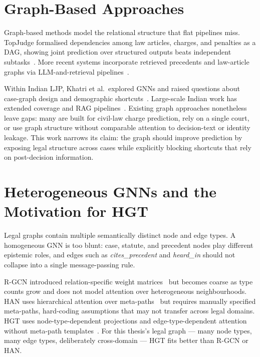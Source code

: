\section{Graph-Based Approaches}

Graph-based methods model the relational structure that flat pipelines miss. TopJudge formalised dependencies among law articles, charges, and penalties as a DAG, showing joint prediction over structured outputs beats independent subtasks~\cite{zhong2018topjudge}. More recent systems incorporate retrieved precedents and law-article graphs via LLM-and-retrieval pipelines~\cite{wu2023pljp, santosh2024precedents}.

Within Indian LJP, Khatri et al.\ explored GNNs and raised questions about case-graph design and demographic shortcuts~\cite{khatri2023indianGNN}. Large-scale Indian work has extended coverage and RAG pipelines~\cite{nigam2025nyayaanumana}. Existing graph approaches nonetheless leave gaps: many are built for civil-law charge prediction, rely on a single court, or use graph structure without comparable attention to decision-text or identity leakage. This work narrows its claim: the graph should improve prediction by exposing legal structure across cases while explicitly blocking shortcuts that rely on post-decision information.

\section{Heterogeneous GNNs and the Motivation for HGT}

Legal graphs contain multiple semantically distinct node and edge types. A homogeneous GNN is too blunt: case, statute, and precedent nodes play different epistemic roles, and edges such as \emph{cites\_precedent} and \emph{heard\_in} should not collapse into a single message-passing rule.

R-GCN introduced relation-specific weight matrices~\cite{schlichtkrull2018rgcn} but becomes coarse as type counts grow and does not model attention over heterogeneous neighbourhoods. HAN uses hierarchical attention over meta-paths~\cite{wang2019han} but requires manually specified meta-paths, hard-coding assumptions that may not transfer across legal domains. HGT uses node-type-dependent projections and edge-type-dependent attention without meta-path templates~\cite{hu2020hgt}. For this thesis's legal graph --- many node types, many edge types, deliberately cross-domain --- HGT fits better than R-GCN or HAN.


